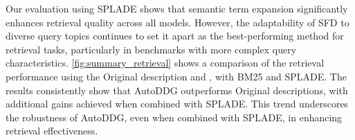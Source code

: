 Our evaluation using SPLADE shows that semantic term expansion significantly enhances retrieval quality across all models. However, the adaptability of SFD to diverse query topics continues to set it apart as the best-performing method for retrieval tasks, particularly in benchmarks with more complex query characteristics.
% 
\autoref{fig:summary_retrieval} 
shows a comparison of the retrieval performance using the Original description and \SystemName, with BM25 and SPLADE. %
% 
The results consistently show that AutoDDG outperforms Original descriptions, with additional gains achieved when combined with SPLADE. This trend underscores the robustness of AutoDDG, even when combined with SPLADE, in enhancing retrieval effectiveness.
% 
% 
% 
% 


